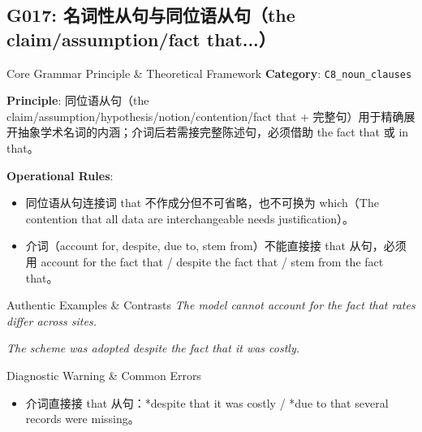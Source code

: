 \subsection{G017: 名词性从句与同位语从句（the claim/assumption/fact that...）}\label{sec:rule:G017}
\begin{ConceptBox}{Core Grammar Principle \& Theoretical Framework}
\textbf{Category}: \texttt{C8\_noun\_clauses}\par\vspace{3pt}
\textbf{Principle}: 同位语从句（the claim/assumption/hypothesis/notion/contention/fact that + 完整句）用于精确展开抽象学术名词的内涵；介词后若需接完整陈述句，必须借助 the fact that 或 in that。\par\vspace{4pt}
\textbf{Operational Rules}:
\begin{itemize}[leftmargin=1.5em, itemsep=1pt]
  \item 同位语从句连接词 that 不作成分但不可省略，也不可换为 which（The contention that all data are interchangeable needs justification）。
  \item 介词（account for, despite, due to, stem from）不能直接接 that 从句，必须用 account for the fact that / despite the fact that / stem from the fact that。
\end{itemize}
\end{ConceptBox}
\begin{ExampleBox}{Authentic Examples \& Contrasts}
\textit{The model cannot account for the fact that rates differ across sites.}\par\vspace{2pt}
\textit{The scheme was adopted despite the fact that it was costly.}\par\vspace{2pt}
\end{ExampleBox}
\begin{TipBox}{Diagnostic Warning \& Common Errors}
\begin{itemize}[leftmargin=1.5em, itemsep=1pt]
  \item 介词直接接 that 从句：*despite that it was costly / *due to that several records were missing。
\end{itemize}
\end{TipBox}
\vspace{6pt}
